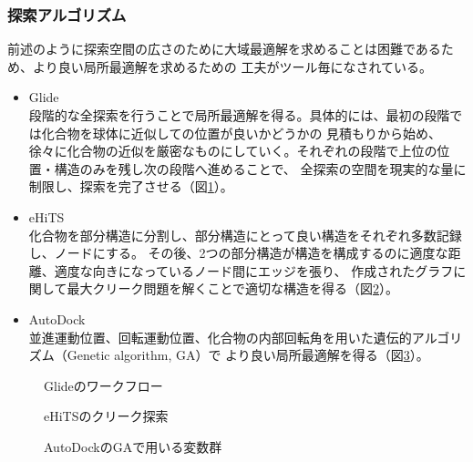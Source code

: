 \subsubsection{探索アルゴリズム}
前述のように探索空間の広さのために大域最適解を求めることは困難であるため、より良い局所最適解を求めるための
工夫がツール毎になされている。
\begin{itemize}
\item Glide\\
	段階的な全探索を行うことで局所最適解を得る。具体的には、最初の段階では化合物を球体に近似しての位置が良いかどうかの
	見積もりから始め、徐々に化合物の近似を厳密なものにしていく。それぞれの段階で上位の位置・構造のみを残し次の段階へ進めることで、
	全探索の空間を現実的な量に制限し、探索を完了させる（図\ref{fig:glide_flowchart}）。
\item eHiTS\\
	化合物を部分構造に分割し、部分構造にとって良い構造をそれぞれ多数記録し、ノードにする。
	その後、2つの部分構造が構造を構成するのに適度な距離、適度な向きになっているノード間にエッジを張り、
	作成されたグラフに関して最大クリーク問題を解くことで適切な構造を得る（図\ref{fig:eHiTS_clique}）。
\item AutoDock\\
	並進運動位置、回転運動位置、化合物の内部回転角を用いた遺伝的アルゴリズム（Genetic algorithm, GA）で
	より良い局所最適解を得る（図\ref{fig:AutoDock_gene}）。
\end{itemize}

\begin{figure}[htb]
 \begin{center}
  \caption{Glideのワークフロー\cite{Friesner2004}}
  \label{fig:glide_flowchart}
 \end{center}
\end{figure}
\begin{figure}[htb]
 \begin{center}
  \caption{eHiTSのクリーク探索}
  \label{fig:eHiTS_clique}
 \end{center}
\end{figure}
\begin{figure}[htb]
 \begin{center}
  \caption{AutoDockのGAで用いる変数群}
  \label{fig:AutoDock_gene}
 \end{center}
\end{figure}


